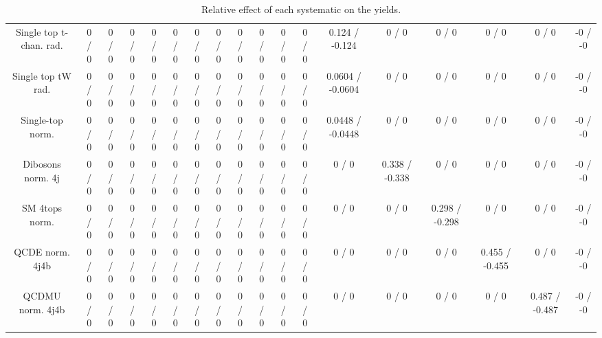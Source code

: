 \documentclass[10pt]{article}
\begin{document}
\begin{table}[htbp]
\begin{center}
\begin{tabular}{|c|c|c|c|c|c|c|c|c|c|c|c|c|c|c|c|c|c|}
  Single top t-chan. rad. & 0 / 0 & 0 / 0 & 0 / 0 & 0 / 0 & 0 / 0 & 0 / 0 & 0 / 0 & 0 / 0 & 0 / 0 & 0 / 0 & 0 / 0 & 0.124 / -0.124 & 0 / 0 & 0 / 0 & 0 / 0 & 0 / 0 & -0 / -0 \\ 
  Single top tW rad. & 0 / 0 & 0 / 0 & 0 / 0 & 0 / 0 & 0 / 0 & 0 / 0 & 0 / 0 & 0 / 0 & 0 / 0 & 0 / 0 & 0 / 0 & 0.0604 / -0.0604 & 0 / 0 & 0 / 0 & 0 / 0 & 0 / 0 & -0 / -0 \\ 
  Single-top norm. & 0 / 0 & 0 / 0 & 0 / 0 & 0 / 0 & 0 / 0 & 0 / 0 & 0 / 0 & 0 / 0 & 0 / 0 & 0 / 0 & 0 / 0 & 0.0448 / -0.0448 & 0 / 0 & 0 / 0 & 0 / 0 & 0 / 0 & -0 / -0 \\ 
  Dibosons norm. 4j & 0 / 0 & 0 / 0 & 0 / 0 & 0 / 0 & 0 / 0 & 0 / 0 & 0 / 0 & 0 / 0 & 0 / 0 & 0 / 0 & 0 / 0 & 0 / 0 & 0.338 / -0.338 & 0 / 0 & 0 / 0 & 0 / 0 & -0 / -0 \\ 
  SM 4tops norm. & 0 / 0 & 0 / 0 & 0 / 0 & 0 / 0 & 0 / 0 & 0 / 0 & 0 / 0 & 0 / 0 & 0 / 0 & 0 / 0 & 0 / 0 & 0 / 0 & 0 / 0 & 0.298 / -0.298 & 0 / 0 & 0 / 0 & -0 / -0 \\ 
  QCDE norm. 4j4b & 0 / 0 & 0 / 0 & 0 / 0 & 0 / 0 & 0 / 0 & 0 / 0 & 0 / 0 & 0 / 0 & 0 / 0 & 0 / 0 & 0 / 0 & 0 / 0 & 0 / 0 & 0 / 0 & 0.455 / -0.455 & 0 / 0 & -0 / -0 \\ 
  QCDMU norm. 4j4b & 0 / 0 & 0 / 0 & 0 / 0 & 0 / 0 & 0 / 0 & 0 / 0 & 0 / 0 & 0 / 0 & 0 / 0 & 0 / 0 & 0 / 0 & 0 / 0 & 0 / 0 & 0 / 0 & 0 / 0 & 0.487 / -0.487 & -0 / -0 \\ 
\hline 
\end{tabular} 
\caption{Relative effect of each systematic on the yields.} 
\end{center} 
\end{table} 
\end{document}
